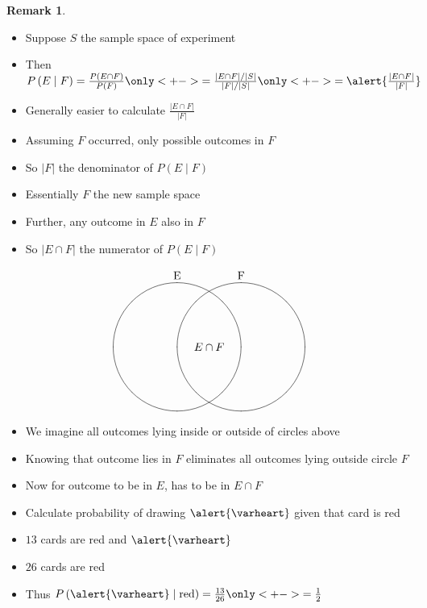 \documentclass{beamer}
\theoremstyle{definition}
\newtheorem{remark}{Remark}
\begin{document}
\begin{frame}
\begin{remark}
\begin{itemize}
\item Suppose $S$ the sample space of experiment
\item Then
$P\left(E\mid F\right)=\frac{P\left(E\cap F\right)}{P\left(F\right)}
\only<+->{=\frac{\left|E\cap F\right|/\left|S\right|}
{\left|F\right|/\left|S\right|}}
\only<+->{=\alert{\frac{\left|E\cap F\right|}{\left|F\right|}}}$
\item Generally easier to calculate
$\frac{\left|E\cap F\right|}{\left|F\right|}$
\item Assuming $F$ occurred, only possible outcomes in $F$
\item So $\left|F\right|$ the denominator of $P\left(E\mid F\right)$
\item Essentially $F$ the \alert{new sample space}
\item Further, any outcome in $E$
also in $F$
\item So $\left|E\cap F\right|$ the numerator of
$P\left(E\mid F\right)$
\end{itemize}
\end{remark}
\end{frame}

\begin{frame}
\[\begin{xy}<1cm,0cm>:
(-1,2)*+!D{\text{E}};
(1,2)*+!D{\text{F}};
(-1,0)*\cir<2cm>{};
(1,0)*\cir<2cm>{};
(0,0)*{E\cap F};
\end{xy}\]
\begin{itemize}
\item We imagine all outcomes lying inside
or outside of circles above
\item Knowing that outcome lies in $F$
eliminates all outcomes lying outside circle $F$
\item Now for outcome to be in $E$, has to be in $E\cap F$
\end{itemize}
\end{frame}

\begin{frame}
\begin{example}
\begin{itemize}
\item Calculate probability of drawing $\alert{\varheart}$ given
that card is red
\item $13$ cards are red and $\alert{\varheart}$
\item $26$ cards are red
\item Thus $P\left(\alert{\varheart}\mid\text{red}\right)
=\frac{13}{26}\only<+->{=\frac{1}{2}}$
\end{itemize}
\end{example}
\end{frame}
\end{document}
